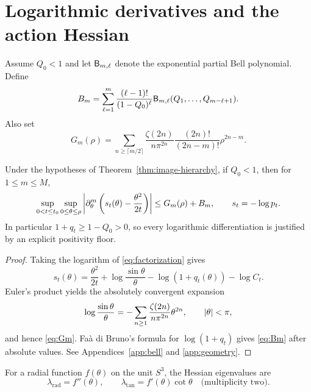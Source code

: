 \section{Logarithmic derivatives and the action Hessian}\label{sec:action}

Assume $Q_0<1$ and let $\mathsf{B}_{m,\ell}$ denote the exponential partial Bell
polynomial.  Define
\begin{equation}\label{eq:Bm}
 B_m=\sum_{\ell=1}^m
 \frac{(\ell-1)!}{(1-Q_0)^\ell}
 \mathsf{B}_{m,\ell}(Q_1,\ldots,Q_{m-\ell+1}).
\end{equation}
Also set
\begin{equation}\label{eq:Gm}
G_m(\rho)=\sum_{n\ge\lceil m/2\rceil}
\frac{\zeta(2n)}{n\pi^{2n}}
\frac{(2n)!}{(2n-m)!}\rho^{2n-m}.
\end{equation}

\begin{theorem}\label{thm:action}
Under the hypotheses of Theorem~\ref{thm:image-hierarchy}, if $Q_0<1$, then
for $1\le m\le M$,
\begin{equation}\label{eq:action-bound}
 \sup_{0<t\le t_0}\sup_{0\le\theta\le\rho}
 \left|\partial_\theta^m\left(s_t(\theta)-\frac{\theta^2}{2t}\right)\right|
 \le G_m(\rho)+B_m,
 \qquad s_t=-\log p_t.
\end{equation}
In particular $1+q_t\ge1-Q_0>0$, so every logarithmic differentiation is
justified by an explicit positivity floor.
\end{theorem}

\begin{proof}
Taking the logarithm of \eqref{eq:factorization} gives
\begin{equation}\label{eq:action-decomp}
s_t(\theta)=\frac{\theta^2}{2t}+\log\frac{\sin\theta}{\theta}
-\log(1+q_t(\theta))-\log C_t.
\end{equation}
Euler's product yields the absolutely convergent expansion
\[
 \log\frac{\sin\theta}{\theta}
 =-\sum_{n\ge1}\frac{\zeta(2n)}{n\pi^{2n}}\theta^{2n},
 \qquad \left|\theta\right|<\pi,
\]
and hence \eqref{eq:Gm}.  Fa\`a di Bruno's formula for
$\log(1+q_t)$ gives \eqref{eq:Bm} after absolute values.  See
Appendices~\ref{app:bell} and \ref{app:geometry}.
\end{proof}

For a radial function $f(\theta)$ on the unit $S^3$, the Hessian eigenvalues
are
\begin{equation}\label{eq:hessian-eigs}
 \lambda_{\mathrm{rad}}=f''(\theta),\qquad
 \lambda_{\mathrm{tan}}=f'(\theta)\cot\theta
 \quad\text{(multiplicity two)}.
\end{equation}

